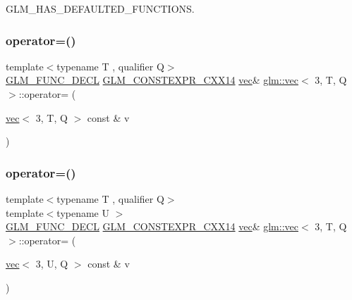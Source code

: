 G\+L\+M\+\_\+\+H\+A\+S\+\_\+\+D\+E\+F\+A\+U\+L\+T\+E\+D\+\_\+\+F\+U\+N\+C\+T\+I\+O\+NS. 

\mbox{\label{structglm_1_1vec_3_013_00_01_t_00_01_q_01_4_ab955dba2c50085c9e1b3f6b0daa36fcc}} 
\subsubsection{\texorpdfstring{operator=()}{operator=()}\hspace{0.1cm}{\footnotesize\ttfamily [2/3]}}
{\footnotesize\ttfamily template$<$typename T , qualifier Q$>$ \\
\hyperlink{setup_8hpp_ab2d052de21a70539923e9bcbf6e83a51}{G\+L\+M\+\_\+\+F\+U\+N\+C\+\_\+\+D\+E\+CL} \hyperlink{setup_8hpp_a4dd12abf5e1164bc57f3a34671d03844}{G\+L\+M\+\_\+\+C\+O\+N\+S\+T\+E\+X\+P\+R\+\_\+\+C\+X\+X14} \hyperlink{structglm_1_1vec}{vec}\& \hyperlink{structglm_1_1vec}{glm\+::vec}$<$ 3, T, Q $>$\+::operator= (\begin{DoxyParamCaption}\item[{\hyperlink{structglm_1_1vec}{vec}$<$ 3, T, Q $>$ const \&}]{v }\end{DoxyParamCaption})}

\mbox{\label{structglm_1_1vec_3_013_00_01_t_00_01_q_01_4_a10cb43cfab9dbc66022f9bd5c121b694}} 
\subsubsection{\texorpdfstring{operator=()}{operator=()}\hspace{0.1cm}{\footnotesize\ttfamily [3/3]}}
{\footnotesize\ttfamily template$<$typename T , qualifier Q$>$ \\
template$<$typename U $>$ \\
\hyperlink{setup_8hpp_ab2d052de21a70539923e9bcbf6e83a51}{G\+L\+M\+\_\+\+F\+U\+N\+C\+\_\+\+D\+E\+CL} \hyperlink{setup_8hpp_a4dd12abf5e1164bc57f3a34671d03844}{G\+L\+M\+\_\+\+C\+O\+N\+S\+T\+E\+X\+P\+R\+\_\+\+C\+X\+X14} \hyperlink{structglm_1_1vec}{vec}\& \hyperlink{structglm_1_1vec}{glm\+::vec}$<$ 3, T, Q $>$\+::operator= (\begin{DoxyParamCaption}\item[{\hyperlink{structglm_1_1vec}{vec}$<$ 3, U, Q $>$ const \&}]{v }\end{DoxyParamCaption})}


